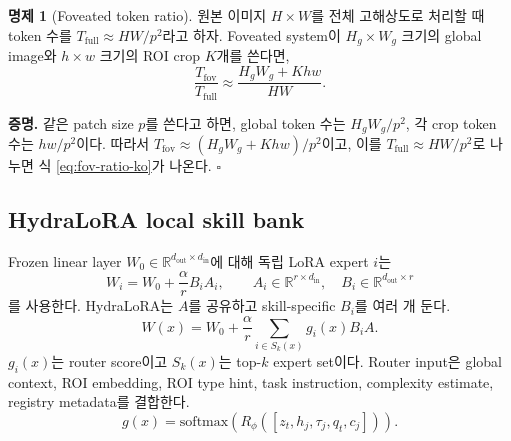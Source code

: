 \documentclass[11pt]{article}
\theoremstyle{definition}
\newtheorem{proposition}{명제}
\begin{document}
\begin{proposition}[Foveated token ratio]
원본 이미지 $H\times W$를 전체 고해상도로 처리할 때 token 수를 $T_{\mathrm{full}}\approx HW/p^2$라고 하자.
Foveated system이 $H_g\times W_g$ 크기의 global image와 $h\times w$ 크기의 ROI crop $K$개를 쓴다면,
\begin{equation}
  \frac{T_{\mathrm{fov}}}{T_{\mathrm{full}}}
  \approx
  \frac{H_gW_g + Khw}{HW}.
  \label{eq:fov-ratio-ko}
\end{equation}
\end{proposition}

\noindent\textbf{증명.}
같은 patch size $p$를 쓴다고 하면, global token 수는 $H_gW_g/p^2$, 각 crop token 수는 $hw/p^2$이다.
따라서 $T_{\mathrm{fov}}\approx (H_gW_g+Khw)/p^2$이고, 이를 $T_{\mathrm{full}}\approx HW/p^2$로 나누면 식 \ref{eq:fov-ratio-ko}가 나온다. \hfill$\square$

\subsection{HydraLoRA local skill bank}

Frozen linear layer $W_0\in\mathbb{R}^{d_{\mathrm{out}}\times d_{\mathrm{in}}}$에 대해 독립 LoRA expert $i$는
\begin{equation}
  W_i = W_0 + \frac{\alpha}{r}B_iA_i,
  \qquad
  A_i\in\mathbb{R}^{r\times d_{\mathrm{in}}},
  \quad
  B_i\in\mathbb{R}^{d_{\mathrm{out}}\times r}
\end{equation}
를 사용한다.
HydraLoRA는 $A$를 공유하고 skill-specific $B_i$를 여러 개 둔다.
\begin{equation}
  W(x)=W_0+\frac{\alpha}{r}\sum_{i\in S_k(x)}g_i(x)B_iA.
  \label{eq:hydra-ko}
\end{equation}
$g_i(x)$는 router score이고 $S_k(x)$는 top-$k$ expert set이다.
Router input은 global context, ROI embedding, ROI type hint, task instruction, complexity estimate, registry metadata를 결합한다.
\begin{equation}
  g(x)=\mathrm{softmax}\left(R_\phi([z_t,h_j,\tau_j,q_t,c_j])\right).
\end{equation}
\end{document}
